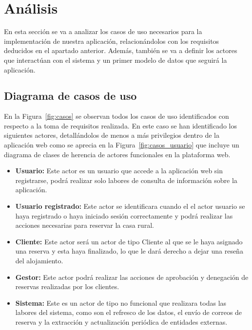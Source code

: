 \section{Análisis}
En esta sección se va a analizar los casos de uso necesarios para la implementación de
nuestra aplicación, relacionándolos con los requisitos deducidos en el apartado anterior.
Además, también se va a definir los actores que interactúan con el sistema y un primer
modelo de datos que seguirá la aplicación.

\subsection{Diagrama de casos de uso} \label{sec:casosuso}

En la Figura~\ref{fig:casos} se observan todos los casos de uso identificados con respecto a la toma de requisitos realizada. En este caso se han identificado los siguientes actores, detallándolos de menos a más privilegios dentro de la aplicación web como se aprecia en la Figura~\ref{fig:casos_usuario} que incluye un diagrama de clases de herencia de actores funcionales en la plataforma web.
\begin{itemize}
    \item \textbf{Usuario:} Este actor es un usuario que accede a la aplicación web sin registrarse, podrá realizar solo labores de consulta de información sobre la aplicación.
    \item \textbf{Usuario registrado:} Este actor se identificara cuando el el actor usuario se haya registrado o haya iniciado sesión correctamente y podrá realizar las acciones necesarias para reservar la casa rural.
    \item \textbf{Cliente:} Este actor será un actor de tipo Cliente al que se le haya asignado una reserva y esta haya finalizado, lo que le dará derecho a dejar una reseña del alojamiento.
    \item \textbf{Gestor:} Este actor podrá realizar las acciones de aprobación y denegación de reservas realizadas por los clientes.
    \item \textbf{Sistema:} Este es un actor de tipo no funcional que realizara todas las labores del sistema, como son el refresco de los datos, el envío de correos de reserva y la extracción y actualización periódica de entidades externas.
\end{itemize}

